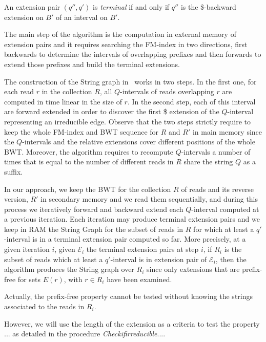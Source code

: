 \documentclass[runningheads,envcountsame,a4paper]{llncs}
\newcommand{\notaestesa}[2]{%
  {\sffamily {\bfseries #1}{\footnotesize #2}}%
  \marginpar{\framebox{\Large *}}%
}
\begin{document}
An extension pair $(q'', q')$ is \emph{terminal} if and only if $q''$ is
the \$-backward extension on $B'$ of an interval on $B'$.
\notaestesa{Paola}{rivedere anche in termini informali}


The main step of the algorithm is the computation in external memory of
extension pairs and it requires searching the FM-index in two
directions, first backwards to determine the intervals of overlapping
prefixes and then forwards to extend those prefixes and build the
terminal extensions.

The construction of the String graph in~\cite{Simpson2010} works in two
steps.
In the first one, for each read $r$ in the collection $R$, all
$Q$-intervals of reads overlapping $r$ are computed in time linear in
the size of $r$.
In the second step, each of this interval are forward extended in order
to discover the first \$ extension of the $Q$-interval representing an
irreducible edge.
Observe that the two steps strictly require to keep the whole FM-index
and BWT sequence for $R$ and $R'$ in main memory since the $Q$-intervals
and the relative extensions cover different positions of the whole BWT.
Moreover, the algorithm requires to recompute $Q$-intervals a number of
times that is equal to the number of different reads in $R$ share the
string $Q$ as a suffix.


In our approach, we keep the BWT for the collection $R$ of reads and its
reverse version, $R'$ in secondary memory and we read them sequentially,
and during this process we iteratively forward and backward extend each
$Q$-interval computed at a previous iteration.
Each iteration may produce terminal extension pairs and we keep in RAM
the String Graph for the subset of reads in $R$ for which at least a
$q'$-interval is in a terminal extension pair computed so far.
More precisely, at a given iteration $i$, given $\mathcal{E}_i$ the
terminal extension pairs at step $i$, if $R_i$ is the subset of reads
which at least a $q'$-interval is in extension pair of $\mathcal{E}_i$,
then the algorithm produces the String graph over $R_i$ since only
extensions that are prefix-free for sets $E(r)$, with $r \in R_i$ have
been examined.

Actually, the prefix-free property cannot be tested without knowing the
strings associated to the reads in $R_i$.

 However, we will use the length of the extension as a criteria to test
the property ... as detailed in the procedure
\emph{Checkifirreducible}....
\end{document}
